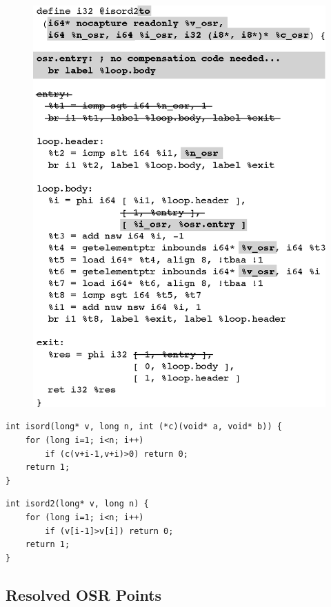 \ifdefined\noauthorea
\begin{figure}[t]
\begin{center}
\includegraphics[width=0.9\columnwidth]{figures/isord2to/isord2to.eps}
\caption{\protect}
\end{center}
\end{figure}
\fi

\begin{verbatim}
int isord(long* v, long n, int (*c)(void* a, void* b)) {
    for (long i=1; i<n; i++) 
        if (c(v+i-1,v+i)>0) return 0;
    return 1;
}
\end{verbatim}

\begin{verbatim}
int isord2(long* v, long n) {
    for (long i=1; i<n; i++) 
        if (v[i-1]>v[i]) return 0;
    return 1;
}
\end{verbatim}

\subsection{Resolved OSR Points}

